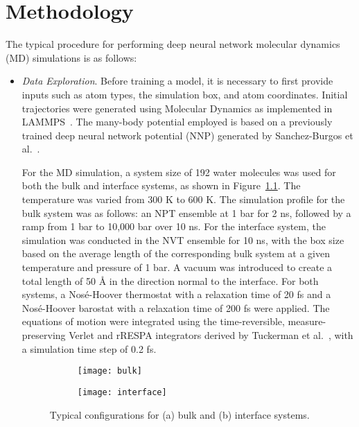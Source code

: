 \chapter{Methodology}

The typical procedure for performing deep neural network molecular dynamics (MD) simulations is as follows:

\begin{itemize}
    \item \emph{Data Exploration}. Before training a model, it is necessary to first provide inputs such as atom types, the simulation box, and atom coordinates. Initial trajectories were generated using Molecular Dynamics as implemented in LAMMPS~\cite{LAMMPS}. The many-body potential employed is based on a previously trained deep neural network potential (NNP) generated by Sanchez-Burgos et al.~\cite{sanchez2023deep}.

          For the MD simulation, a system size of 192 water molecules was used for both the bulk and interface systems, as shown in Figure~\ref{fig:cryst_sctruct}. The temperature was varied from 300 K to 600 K. The simulation profile for the bulk system was as follows: an NPT ensemble at 1 bar for 2 ns, followed by a ramp from 1 bar to 10,000 bar over 10 ns. For the interface system, the simulation was conducted in the NVT ensemble for 10 ns, with the box size based on the average length of the corresponding bulk system at a given temperature and pressure of 1 bar. A vacuum was introduced to create a total length of 50 \r{A} in the direction normal to the interface. For both systems, a Nosé-Hoover thermostat with a relaxation time of 20 fs and a Nosé-Hoover barostat with a relaxation time of 200 fs were applied. The equations of motion were integrated using the time-reversible, measure-preserving Verlet and rRESPA integrators derived by Tuckerman et al.~\cite{Tuckerman2006}, with a simulation time step of 0.2 fs.

          \begin{figure}[tbhp]
              \centering
              \begin{subfigure}{0.42\textwidth}
                  \centering
                  \texttt{[image: bulk]}
                  \caption{}
              \end{subfigure}
              \begin{subfigure}{0.42\textwidth}
                  \centering
                  \texttt{[image: interface]}
                  \caption{}
              \end{subfigure}
              \hfill
              \caption{Typical configurations for (a) bulk and (b) interface
                  systems.}\label{fig:cryst_sctruct}
          \end{figure}


\end{itemize}
